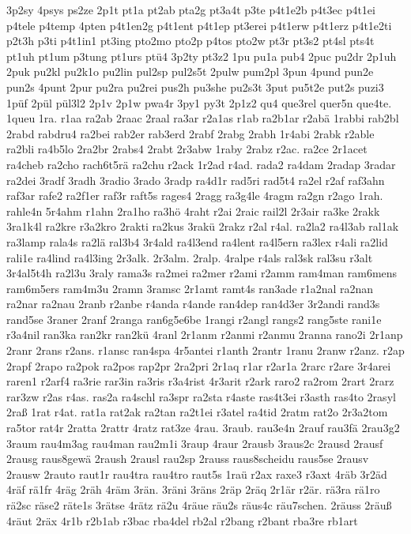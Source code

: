{3p2sy
4psys
ps2ze
2p1t
pt1a
pt2ab
pta2g
pt3a4t
p3te
p4t1e2b
p4t3ec
p4t1ei
p4tele
p4temp
4pten
p4t1en2g
p4t1ent
p4t1ep
pt3erei
p4t1erw
p4t1erz
p4t1e2ti
p2t3h
p3ti
p4t1in1
pt3ing
pto2mo
pto2p
p4tos
pto2w
pt3r
pt3s2
pt4sl
pts4t
pt1uh
pt1um
p3tung
pt1urs
ptü4
3p2ty
pt3z2
1pu
pu1a
pub4
2puc
pu2dr
2p1uh
2puk
pu2kl
pu2k1o
pu2lin
pul2sp
pul2s5t
2pulw
pum2pl
3pun
4pund
pun2e
pun2s
4punt
2pur
pu2ra
pu2rei
pus2h
pu3she
pu2s3t
3put
pu5t2e
put2s
puzi3
1püf
2pül
pül3l2
2p1v
2p1w
pwa4r
3py1
py3t
2p1z2
qu4
que3rel
quer5n
que4te.
1queu
1ra.
r1aa
ra2ab
2raac
2raal
ra3ar
r2a1as
r1ab
ra2b1ar
r2abä
1rabbi
rab2bl
2rabd
rabdru4
ra2bei
rab2er
rab3erd
2rabf
2rabg
2rabh
1r4abi
2rabk
r2able
ra2bli
ra4b5lo
2ra2br
2rabs4
2rabt
2r3abw
1raby
2rabz
r2ac.
ra2ce
2r1acet
ra4cheb
ra2cho
rach6t5rä
ra2chu
r2ack
1r2ad
r4ad.
rada2
ra4dam
2radap
3radar
ra2dei
3radf
3radh
3radio
3rado
3radp
ra4d1r
rad5ri
rad5t4
ra2el
r2af
raf3ahn
raf3ar
rafe2
ra2f1er
raf3r
raft5s
rages4
2ragg
ra3g4le
4ragm
ra2gn
r2ago
1rah.
rahle4n
5r4ahm
r1ahn
2ra1ho
ra3hö
4raht
r2ai
2raic
rail2l
2r3air
ra3ke
2rakk
3ra1k4l
ra2kre
r3a2kro
2rakti
ra2kus
3rakü
2rakz
r2al
r4al.
ra2la2
ra4l3ab
ral1ak
ra3lamp
rala4s
ra2lä
ral3b4
3r4ald
ra4l3end
ra4lent
ra4l5ern
ra3lex
r4ali
ra2lid
rali1e
ra4lind
ra4l3ing
2r3alk.
2r3alm.
2ralp.
4ralpe
r4als
ral3sk
ral3su
r3alt
3r4al5t4h
ra2l3u
3raly
rama3s
ra2mei
ra2mer
r2ami
r2amm
ram4man
ram6mens
ram6m5ers
ram4m3u
2ramn
3ramsc
2r1amt
ramt4s
ran3ade
r1a2nal
ra2nan
ra2nar
ra2nau
2ranb
r2anbe
r4anda
r4ande
ran4dep
ran4d3er
3r2andi
rand3s
rand5se
3raner
2ranf
2ranga
ran6g5e6be
1rangi
r2angl
rangs2
rang5ste
rani1e
r3a4nil
ran3ka
ran2kr
ran2kü
4ranl
2r1anm
r2anmi
r2anmu
2ranna
rano2i
2r1anp
2ranr
2rans
r2ans.
r1ansc
ran4spa
4r5antei
r1anth
2rantr
1ranu
2ranw
r2anz.
r2ap
2rapf
2rapo
ra2pok
ra2pos
rap2pr
2ra2pri
2r1aq
r1ar
r2ar1a
2rarc
r2are
3r4arei
raren1
r2arf4
ra3rie
rar3in
ra3ris
r3a4rist
4r3arit
r2ark
raro2
ra2rom
2rart
2rarz
rar3zw
r2as
r4as.
ras2a
ra4schl
ra3spr
ra2sta
r4aste
ras4t3ei
r3asth
ras4to
2rasyl
2raß
1rat
r4at.
rat1a
rat2ak
ra2tan
ra2t1ei
r3atel
ra4tid
2ratm
rat2o
2r3a2tom
ra5tor
rat4r
2ratta
2rattr
4ratz
rat3ze
4rau.
3raub.
rau3e4n
2rauf
rau3fä
2rau3g2
3raum
rau4m3ag
rau4man
rau2m1i
3raup
4raur
2rausb
3raus2c
2rausd
2rausf
2rausg
raus8gewä
2raush
2rausl
rau2sp
2rauss
raus8scheidu
raus5se
2rausv
2rausw
2rauto
raut1r
rau4tra
rau4tro
raut5s
1raü
r2ax
raxe3
r3axt
4räb
3r2äd
4räf
rä1fr
4räg
2räh
4räm
3rän.
3räni
3räns
2räp
2räq
2r1är
r2är.
rä3ra
rä1ro
rä2sc
räse2
räte1s
3rätse
4rätz
rä2u
4räue
räu2s
räus4c
räu7schen.
2räuss
2räuß
4räut
2räx
4r1b
r2b1ab
r3bac
rba4del
rb2al
r2bang
r2bant
rba3re
rb1art
}
